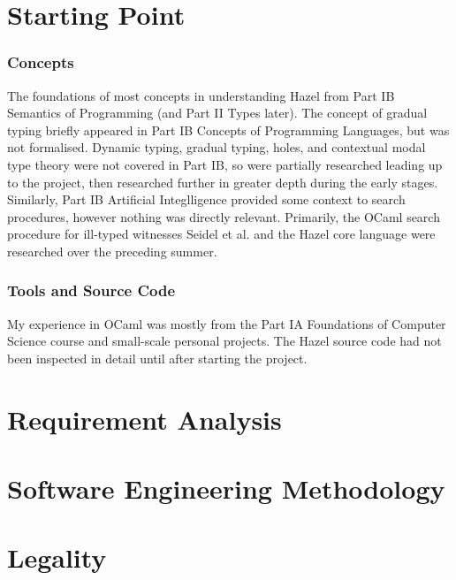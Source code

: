 \section{Starting Point}
\subsubsection{Concepts}
The foundations of most concepts in understanding Hazel from Part IB Semantics of Programming (and Part II Types later). The concept of gradual typing briefly appeared in Part IB Concepts of Programming Languages, but was not formalised. Dynamic typing, gradual typing, holes, and contextual modal type theory were not covered in Part IB, so were partially researched leading up to the project, then researched further in greater depth during the early stages. Similarly, Part IB Artificial Integlligence provided some context to search procedures, however nothing was directly relevant. Primarily, the OCaml search procedure for ill-typed witnesses Seidel et al. \cite{SearchProc} and the Hazel core language \cite{HazelLivePaper} were researched over the preceding summer.

\subsubsection{Tools and Source Code}
My experience in OCaml was mostly from the Part IA Foundations of Computer Science course and small-scale personal projects. The Hazel source code had not been inspected in detail until after starting the project.

\section{Requirement Analysis}

\section{Software Engineering Methodology}

\section{Legality}
